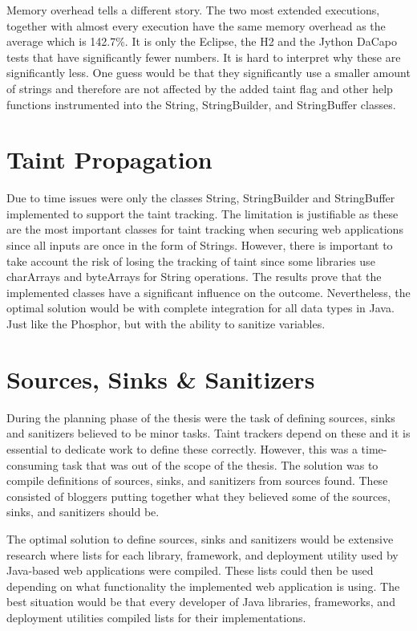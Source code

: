 Memory overhead tells a different story. The two most extended executions, together with almost every execution have the same memory overhead as the average which is 142.7\%. It is only the Eclipse, the H2 and the Jython DaCapo tests that have significantly fewer numbers. It is hard to interpret why these are significantly less. One guess would be that they significantly use a smaller amount of strings and therefore are not affected by the added taint flag and other help functions instrumented into the String, StringBuilder, and StringBuffer classes.



\section{Taint Propagation}
\label{propagation}
Due to time issues were only the classes String, StringBuilder and StringBuffer implemented to support the taint tracking. The limitation is justifiable as these are the most important classes for taint tracking when securing web applications since all inputs are once in the form of Strings. However, there is important to take account the risk of losing the tracking of taint since some libraries use charArrays and byteArrays for String operations. The results prove that the implemented classes have a significant influence on the outcome. Nevertheless, the optimal solution would be with complete integration for all data types in Java. Just like the Phosphor, but with the ability to sanitize variables.



\section{Sources, Sinks \& Sanitizers}
\label{sss}
During the planning phase of the thesis were the task of defining sources, sinks and sanitizers believed to be minor tasks. Taint trackers depend on these and it is essential to dedicate work to define these correctly. However, this was a time-consuming task that was out of the scope of the thesis. The solution was to compile definitions of sources, sinks, and sanitizers from sources found. These consisted of bloggers putting together what they believed some of the sources, sinks, and sanitizers should be.

The optimal solution to define sources, sinks and sanitizers would be extensive research where lists for each library, framework, and deployment utility used by Java-based web applications were compiled. These lists could then be used depending on what functionality the implemented web application is using. The best situation would be that every developer of Java libraries, frameworks, and deployment utilities compiled lists for their implementations.

